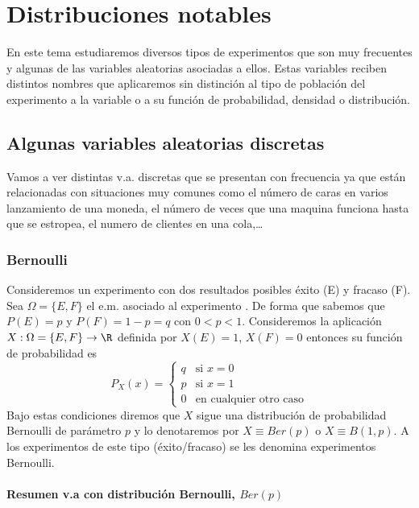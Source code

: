 \chapter{Distribuciones notables}

En este tema estudiaremos diversos tipos de experimentos que son muy frecuentes y algunas
de las variables aleatorias asociadas a ellos. Estas variables reciben distintos nombres
que aplicaremos sin distinción al tipo de población del experimento a la variable o a su
función de probabilidad, densidad o distribución.

 \section{Algunas variables aleatorias discretas}

Vamos a ver distintas v.a. discretas que se presentan con frecuencia ya que están
relacionadas con situaciones muy comunes como el número de caras en varios lanzamiento de
una moneda, el número de veces que una maquina funciona hasta que se estropea, el numero de
clientes en una cola,\ldots

    \subsection{Bernoulli}
    Consideremos un experimento con dos resultados posibles éxito (E) y
    fracaso (F). Sea $\Omega=\{E,F\}$ el e.m. asociado al experimento . De
    forma que sabemos que  $P(E)=p$ y $P(F)=1-p=q$ con $0<p<1$.
    Consideremos la  aplicación $X:\Omega=\{E,F\}\to \R$ definida por
    $X(E)=1$, $X(F)=0$ entonces su  función de probabilidad es
    $$P_{X}(x)=\left\{\begin{array}{ll} q & \mbox{si } x=0\\
    p & \mbox{si } x=1\\
    0 & \mbox{en cualquier otro caso}\end{array}\right.$$
    Bajo estas condiciones diremos que $X$ sigue una distribución de
    probabilidad  Bernoulli de parámetro $p$ y lo denotaremos por
    $X\equiv Ber(p)$ o $X\equiv B(1,p)$. A los experimentos de este tipo (éxito/fracaso)
    se les denomina experimentos Bernoulli.

\subsubsection{Resumen v.a con distribución Bernoulli, $Ber(p)$}


